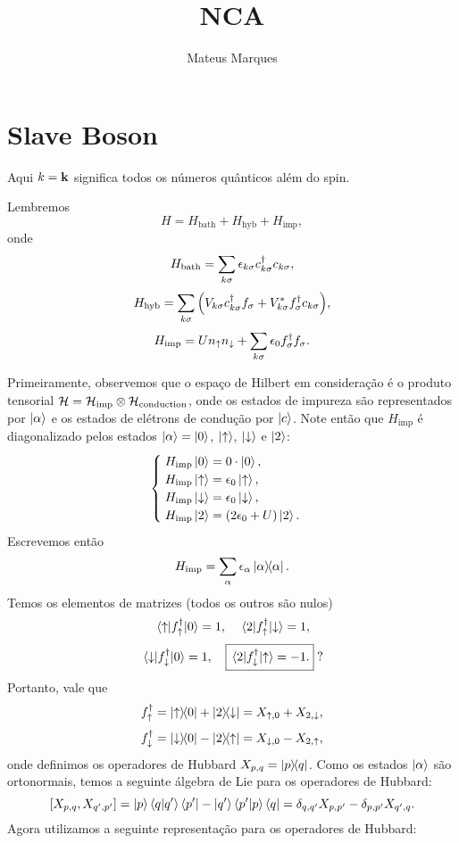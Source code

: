 \documentclass[a4paper,fleqn,12pt]{article}
\title{\Huge{\textbf{NCA}}}
\author{Mateus Marques}
\begin{document}
\maketitle

\section{Slave Boson}

Aqui $k = \vb{k}$ significa todos os números quânticos além do spin.

Lembremos
$$
H = H_{\text{bath}} + H_{\text{hyb}} + H_{\text{imp}},
$$
onde
$$
H_{\text{bath}} = \sum_{k \sigma} \epsilon_{k \sigma} c_{k \sigma}^\dagger c_{k\sigma},
$$
$$
H_{\text{hyb}} = \sum_{k \sigma}
\Big(
V_{k\sigma} c_{k\sigma}^\dagger f_\sigma + V_{k\sigma}^* f_\sigma^\dagger c_{k\sigma}
\Big),
$$
$$
H_{\text{imp}} = U n_{\uparrow} n_\downarrow + \sum_{k \sigma} \epsilon_{0} f_{\sigma}^\dagger f_{\sigma}.
$$

Primeiramente, observemos que o espaço de Hilbert em consideração é o produto tensorial $\mathcal{H} = \mathcal{H}_{\text{imp}} \otimes \mathcal{H}_{\text{conduction}}$, onde os estados de impureza são representados por $\ket{\alpha}$ e os estados de elétrons de condução por $\ket{c}$. Note então que $H_{\text{imp}}$ é diagonalizado pelos estados $\ket{\alpha} = \ket{0}$, $\ket{\uparrow}$, $\ket{\downarrow}$ e $\ket{2}$:
$$
\begin{cases}
\; H_{\text{imp}} \ket{0} = 0 \cdot \ket{0}, \\
\; H_{\text{imp}} \ket{\uparrow} = \epsilon_0 \ket{\uparrow}, \\
\; H_{\text{imp}} \ket{\downarrow} = \epsilon_0 \ket{\downarrow}, \\
\; H_{\text{imp}} \ket{2}   = (2\epsilon_0 + U) \ket{2}.
\end{cases}
$$
Escrevemos então
$$
H_{\text{imp}} = \sum_\alpha \epsilon_\alpha \ketbra{\alpha}{\alpha}.
$$
Temos os elementos de matrizes (todos os outros são nulos)
$$
\mel{\uparrow}{f_\uparrow^\dagger}{0} = 1, \quad \mel{2}{f_\uparrow^\dagger}{\downarrow} = 1,
$$
$$
\mel{\downarrow}{f_\downarrow^\dagger}{0} = 1, \quad \boxed{\mel{2}{f_\downarrow^\dagger}{\uparrow} = -1.} \; ?
$$
Portanto, vale que
$$
f_\uparrow^\dagger = \ketbra{\uparrow}{0} + \ketbra{2}{\downarrow} = X_{\uparrow, 0} + X_{2, \downarrow},
$$
$$
f_\downarrow^\dagger = \ketbra{\downarrow}{0} - \ketbra{2}{\uparrow} = X_{\downarrow, 0} - X_{2, \uparrow},
$$
onde definimos os operadores de Hubbard $X_{p, q} = \ketbra{p}{q}$. Como os estados $\ket{\alpha}$ são ortonormais, temos a seguinte álgebra de Lie para os operadores de Hubbard:
$$
[X_{p, q}, X_{q', p'}] = \ket{p}\braket{q}{q'}\bra{p'} - \ket{q'}\braket{p'}{p}\bra{q}
= \delta_{q, q'} X_{p, p'} - \delta_{p, p'} X_{q', q}.
$$
Agora utilizamos a seguinte representação para os operadores de Hubbard:

\n
\end{document}
